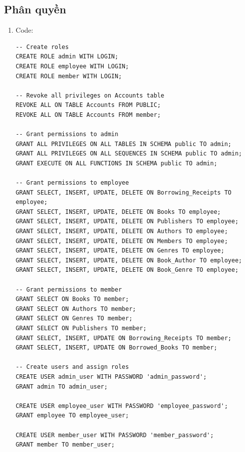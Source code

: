 \documentclass[12pt]{article}
\begin{document}
\subsection{Phân quyền}
\begin{enumerate}
\item Code:
\begin{lstlisting}
-- Create roles
CREATE ROLE admin WITH LOGIN;
CREATE ROLE employee WITH LOGIN;
CREATE ROLE member WITH LOGIN;

-- Revoke all privileges on Accounts table
REVOKE ALL ON TABLE Accounts FROM PUBLIC;
REVOKE ALL ON TABLE Accounts FROM member;

-- Grant permissions to admin
GRANT ALL PRIVILEGES ON ALL TABLES IN SCHEMA public TO admin;
GRANT ALL PRIVILEGES ON ALL SEQUENCES IN SCHEMA public TO admin;
GRANT EXECUTE ON ALL FUNCTIONS IN SCHEMA public TO admin;

-- Grant permissions to employee
GRANT SELECT, INSERT, UPDATE, DELETE ON Borrowing_Receipts TO employee;
GRANT SELECT, INSERT, UPDATE, DELETE ON Books TO employee;
GRANT SELECT, INSERT, UPDATE, DELETE ON Publishers TO employee;
GRANT SELECT, INSERT, UPDATE, DELETE ON Authors TO employee;
GRANT SELECT, INSERT, UPDATE, DELETE ON Members TO employee;
GRANT SELECT, INSERT, UPDATE, DELETE ON Genres TO employee;
GRANT SELECT, INSERT, UPDATE, DELETE ON Book_Author TO employee;
GRANT SELECT, INSERT, UPDATE, DELETE ON Book_Genre TO employee;

-- Grant permissions to member
GRANT SELECT ON Books TO member;
GRANT SELECT ON Authors TO member;
GRANT SELECT ON Genres TO member;
GRANT SELECT ON Publishers TO member;
GRANT SELECT, INSERT, UPDATE ON Borrowing_Receipts TO member;
GRANT SELECT, INSERT, UPDATE ON Borrowed_Books TO member;

-- Create users and assign roles
CREATE USER admin_user WITH PASSWORD 'admin_password';
GRANT admin TO admin_user;

CREATE USER employee_user WITH PASSWORD 'employee_password';
GRANT employee TO employee_user;

CREATE USER member_user WITH PASSWORD 'member_password';
GRANT member TO member_user;


\end{lstlisting}
\end{enumerate}
\end{document}
